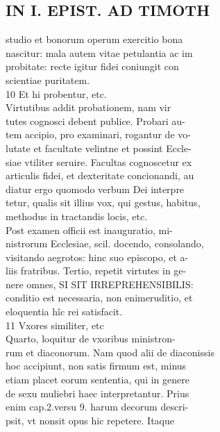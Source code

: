 \documentclass{article}
\begin{document}
\begin{pages}
\section*{IN I. EPIST. AD TIMOTH \\
                }
studio et bonorum operum exercitio bona \\
                nascitur: mala autem vitae petulantia ac im \\
                probitate: recte igitur fidei coniungit con \\
                scientiae puritatem. \\
                10 Et hi probentur, etc. \\
                Virtutibus addit probationem, nam vir \\
                tutes cognosci debent publice. Probari au- \\
                tem accipio, pro examinari, rogantur de vo- \\
                lutate et facultate velintne et possint Eccle- \\
                siae vtiliter seruire. Facultas cognoscetur ex \\
                articulis fidei, et dexteritate concionandi, au \\
                diatur ergo quomodo verbum Dei interpre \\
                tetur, qualis sit illius vox, qui gestus, habitus, \\
                methodus in tractandis locis, etc. \\
                Post examen officii est inauguratio, mi- \\
                nistrorum Ecclesiae, scil. docendo, consolando, \\
                visitando aegrotos: hinc suo episcopo, et a- \\
                liis fratribus. Tertio, repetit virtutes in ge- \\
                nere omnes, SI SIT IRREPREHENSIBILIS: \\
                conditio est necessaria, non enimeruditio, et \\
                eloquentia hîc rei satisfacit. \\
                11 Vxores similiter, etc \\
                Quarto, loquitur de vxoribus ministron- \\
                rum et diaconorum. Nam quod alii de diaconissis \\
                hoc accipiunt, non satis firmum est, minus \\
                etiam placet eorum sententia, qui in genere \\
                de sexu muliebri haec interpretantur. Prius \\
                enim cap.2.versu 9. harum decorum descri- \\
                psit, vt nonsit opus hic repetere. Itaque \\
                

\end{pages}
\end{document}
